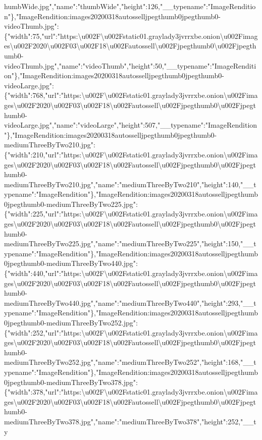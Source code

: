 humbWide.jpg","name":"thumbWide","height":126,"\_\_typename":"ImageRendition"\},"ImageRendition:images20200318autosselljpegthumb0jpegthumb0-videoThumb.jpg":\{"width":75,"url":"https:\textbackslash{}u002F\textbackslash{}u002Fstatic01.graylady3jvrrxbe.onion\textbackslash{}u002Fimages\textbackslash{}u002F2020\textbackslash{}u002F03\textbackslash{}u002F18\textbackslash{}u002Fautossell\textbackslash{}u002Fjpegthumb0\textbackslash{}u002Fjpegthumb0-videoThumb.jpg","name":"videoThumb","height":50,"\_\_typename":"ImageRendition"\},"ImageRendition:images20200318autosselljpegthumb0jpegthumb0-videoLarge.jpg":\{"width":768,"url":"https:\textbackslash{}u002F\textbackslash{}u002Fstatic01.graylady3jvrrxbe.onion\textbackslash{}u002Fimages\textbackslash{}u002F2020\textbackslash{}u002F03\textbackslash{}u002F18\textbackslash{}u002Fautossell\textbackslash{}u002Fjpegthumb0\textbackslash{}u002Fjpegthumb0-videoLarge.jpg","name":"videoLarge","height":507,"\_\_typename":"ImageRendition"\},"ImageRendition:images20200318autosselljpegthumb0jpegthumb0-mediumThreeByTwo210.jpg":\{"width":210,"url":"https:\textbackslash{}u002F\textbackslash{}u002Fstatic01.graylady3jvrrxbe.onion\textbackslash{}u002Fimages\textbackslash{}u002F2020\textbackslash{}u002F03\textbackslash{}u002F18\textbackslash{}u002Fautossell\textbackslash{}u002Fjpegthumb0\textbackslash{}u002Fjpegthumb0-mediumThreeByTwo210.jpg","name":"mediumThreeByTwo210","height":140,"\_\_typename":"ImageRendition"\},"ImageRendition:images20200318autosselljpegthumb0jpegthumb0-mediumThreeByTwo225.jpg":\{"width":225,"url":"https:\textbackslash{}u002F\textbackslash{}u002Fstatic01.graylady3jvrrxbe.onion\textbackslash{}u002Fimages\textbackslash{}u002F2020\textbackslash{}u002F03\textbackslash{}u002F18\textbackslash{}u002Fautossell\textbackslash{}u002Fjpegthumb0\textbackslash{}u002Fjpegthumb0-mediumThreeByTwo225.jpg","name":"mediumThreeByTwo225","height":150,"\_\_typename":"ImageRendition"\},"ImageRendition:images20200318autosselljpegthumb0jpegthumb0-mediumThreeByTwo440.jpg":\{"width":440,"url":"https:\textbackslash{}u002F\textbackslash{}u002Fstatic01.graylady3jvrrxbe.onion\textbackslash{}u002Fimages\textbackslash{}u002F2020\textbackslash{}u002F03\textbackslash{}u002F18\textbackslash{}u002Fautossell\textbackslash{}u002Fjpegthumb0\textbackslash{}u002Fjpegthumb0-mediumThreeByTwo440.jpg","name":"mediumThreeByTwo440","height":293,"\_\_typename":"ImageRendition"\},"ImageRendition:images20200318autosselljpegthumb0jpegthumb0-mediumThreeByTwo252.jpg":\{"width":252,"url":"https:\textbackslash{}u002F\textbackslash{}u002Fstatic01.graylady3jvrrxbe.onion\textbackslash{}u002Fimages\textbackslash{}u002F2020\textbackslash{}u002F03\textbackslash{}u002F18\textbackslash{}u002Fautossell\textbackslash{}u002Fjpegthumb0\textbackslash{}u002Fjpegthumb0-mediumThreeByTwo252.jpg","name":"mediumThreeByTwo252","height":168,"\_\_typename":"ImageRendition"\},"ImageRendition:images20200318autosselljpegthumb0jpegthumb0-mediumThreeByTwo378.jpg":\{"width":378,"url":"https:\textbackslash{}u002F\textbackslash{}u002Fstatic01.graylady3jvrrxbe.onion\textbackslash{}u002Fimages\textbackslash{}u002F2020\textbackslash{}u002F03\textbackslash{}u002F18\textbackslash{}u002Fautossell\textbackslash{}u002Fjpegthumb0\textbackslash{}u002Fjpegthumb0-mediumThreeByTwo378.jpg","name":"mediumThreeByTwo378","height":252,"\_\_ty